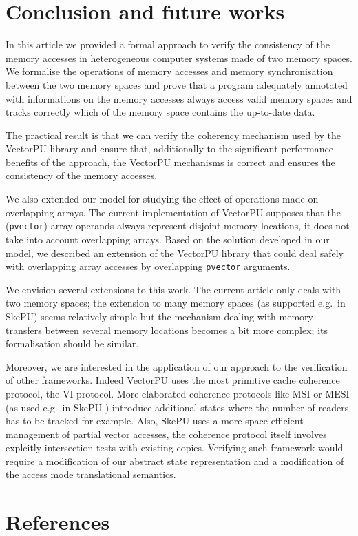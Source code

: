 \documentclass[preprint,12pt]{elsarticle}
\begin{document}
\section{Conclusion and future works}\label{sec:conclusion}
In this article we provided a formal approach to verify the consistency of the memory 
accesses in heterogeneous computer systems made of two memory spaces. We formalise the 
operations of memory accesses and memory synchronisation between the two memory spaces 
and prove that a program adequately annotated with informations on the memory accesses 
always access valid memory spaces and tracks correctly which of the memory space contains 
the up-to-date data.

The practical result is that we can verify the coherency mechanism used by the VectorPU 
library and ensure that, additionally to the significant performance benefits of the 
approach, the VectorPU mechanisms is correct and ensures the consistency of the memory 
accesses.

We also extended our model for studying the effect of
operations made on overlapping arrays.
The current implementation of VectorPU supposes that the 
(\texttt{pvector}) array operands always
represent disjoint memory locations, it does not 
take into account overlapping arrays. 
Based on the solution developed in our model,
we described an extension of the VectorPU library that could 
deal safely with overlapping array accesses by
overlapping \texttt{pvector} arguments.

We envision several extensions to this work.
The current article only deals with two memory spaces; the extension to many 
memory spaces (as supported e.g.\ in SkePU)
seems relatively simple but  the mechanism dealing 
with memory transfers between several memory locations becomes a bit more complex; its 
formalisation should be similar.

Moreover, we are interested in the application of our approach to the 
verification of other frameworks. 
Indeed VectorPU uses the most primitive
cache coherence protocol, the VI-protocol.
 More elaborated coherence protocols like MSI or MESI 
 (as used e.g.\ in SkePU \cite{Dastgeer-IJPP15}) 
 introduce additional states where the
 number of readers has to be tracked for example. 
 Also, SkePU uses a more space-efficient management of
 partial vector accesses, the
 coherence protocol itself involves explcitly intersection tests with
 existing copies. 
 Verifying such framework would require 
 a modification of our abstract state representation and a modification of the access 
 mode translational semantics.
\section*{References}
 

\end{document}
